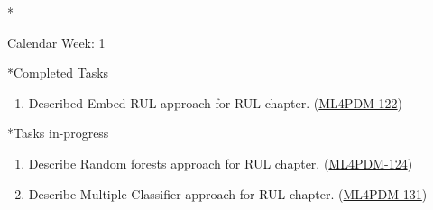 \documentclass[11pt,a4paper]{article}
\begin{document}
\newpage
\begin{section}*{Calendar Week: 1 \hfill \date{8 January, 2021}}
 \begin{refsection}

   \begin{subsection}*{Completed Tasks}
     \begin{enumerate}
       \item
             Described Embed-RUL approach \cite{DBLP:journals/corr/abs-1709-01073} for RUL chapter. (\href{https://ml4pdm.atlassian.net/browse/ML4PDM-122}{ML4PDM-122})
     \end{enumerate}
   \end{subsection}

   \begin{subsection}*{Tasks in-progress}
     \begin{enumerate}
       \item
             Describe Random forests approach \cite{GSCH:jennings2016forecasting, GSCH:cutler2012random} for RUL chapter. (\href{https://ml4pdm.atlassian.net/browse/ML4PDM-124}{ML4PDM-124})
       \item
             Describe Multiple Classifier approach \cite{DBLP:journals/tii/SustoSPMB15} for RUL chapter. (\href{https://ml4pdm.atlassian.net/browse/ML4PDM-131}{ML4PDM-131})
     \end{enumerate}
   \end{subsection}

   \printbibliography
 \end{refsection}
\end{section}
\end{document}
